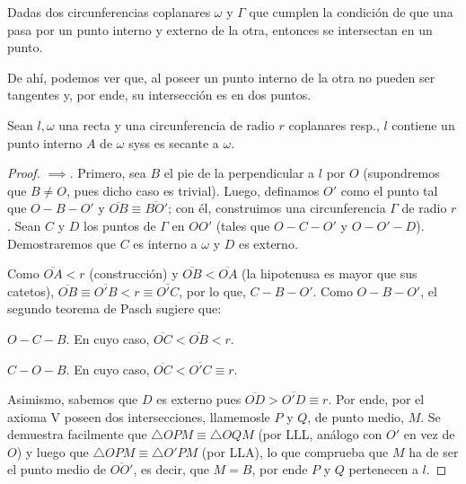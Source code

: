 \documentclass[11pt,a4paper]{book}
\begin{document}
\begin{axiom}
Dadas dos circunferencias coplanares $\omega$ y $\Gamma$ que cumplen la condición de que una pasa por un punto interno y externo de la otra, entonces se intersectan en un punto.
\end{axiom}
De ahí, podemos ver que, al poseer un punto interno de la otra no pueden ser tangentes y, por ende, su intersección es en dos puntos.
\begin{prop}
Sean $l,\omega$ una recta y una circunferencia de radio $r$ coplanares resp., $l$ contiene un punto interno $A$ de $\omega$ syss es secante a $\omega$.
\end{prop}
\begin{proof}
$\implies$. Primero, sea $B$ el pie de la perpendicular a $l$ por $O$ (supondremos que $B\neq O$, pues dicho caso es trivial). Luego, definamos $O'$ como el punto tal que $O-B-O'$ y $\overline{OB}\equiv\overline{BO'}$; con él, construimos una circunferencia $\Gamma$ de radio $r$. Sean $C$ y $D$ los puntos de $\Gamma$ en $OO'$ (tales que $O-C-O'$ y $O-O'-D$). Demostraremos que $C$ es interno a $\omega$ y $D$ es externo.
\begin{figure}
\centering
{}
\caption{}
\end{figure}

Como $\overline{OA}\lt r$ (construcción) y $\overline{OB}\lt\overline{OA}$ (la hipotenusa es mayor que sus catetos), $\overline{OB}\equiv\overline{O'B}\lt r\equiv\overline{O'C}$, por lo que, $C-B-O'$. Como $O-B-O'$, el segundo teorema de Pasch sugiere que:

$O-C-B$. En cuyo caso, $\overline{OC}\lt\overline{OB}\lt r$.

$C-O-B$. En cuyo caso, $\overline{OC}\lt\overline{O'C}\equiv r$.

Asimismo, sabemos que $D$ es externo pues $\overline{OD}\gt\overline{O'D}\equiv r$. Por ende, por el axioma V poseen dos intersecciones, llamemosle $P$ y $Q$, de punto medio, $M$. Se demuestra facilmente que $\triangle OPM\equiv\triangle OQM$ (por LLL, análogo con $O'$ en vez de $O$) y luego que $\triangle OPM\equiv\triangle O'PM$ (por LLA), lo que comprueba que $M$ ha de ser el punto medio de $\overline{OO'}$, es decir, que $M=B$, por ende $P$ y $Q$ pertenecen a $l$. 
\end{proof}
\end{document}
